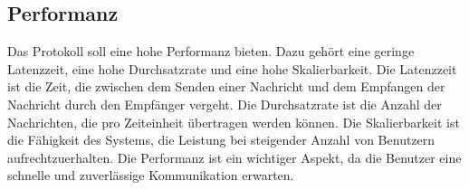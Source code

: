 \subsection{Performanz}

Das Protokoll soll eine hohe Performanz bieten. Dazu gehört eine geringe Latenzzeit, eine hohe
Durchsatzrate und eine hohe Skalierbarkeit. Die Latenzzeit ist die Zeit, die zwischen dem Senden einer Nachricht und dem
Empfangen der Nachricht durch den Empfänger vergeht. Die Durchsatzrate ist die Anzahl der Nachrichten, die pro Zeiteinheit
übertragen werden können. Die Skalierbarkeit ist die Fähigkeit des Systems, die Leistung bei steigender Anzahl von Benutzern
aufrechtzuerhalten. Die Performanz ist ein wichtiger Aspekt, da die Benutzer eine schnelle und zuverlässige Kommunikation
erwarten.
